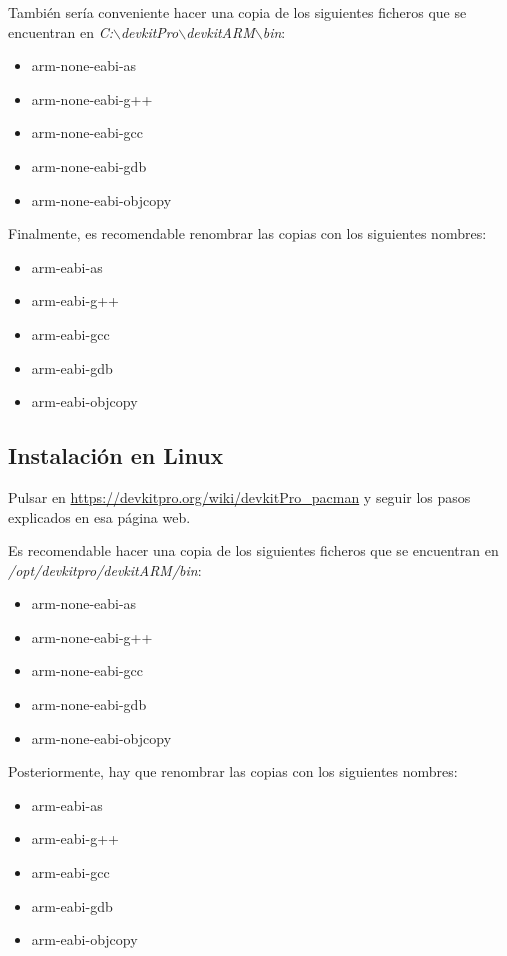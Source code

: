 También sería conveniente hacer una copia de los siguientes ficheros que se encuentran en 
\textit{C:$\backslash$devkitPro$\backslash$devkitARM$\backslash$bin}:
\begin{itemize}
\item arm-none-eabi-as
\item arm-none-eabi-g++
\item arm-none-eabi-gcc
\item arm-none-eabi-gdb
\item arm-none-eabi-objcopy
\end{itemize}

Finalmente, es recomendable renombrar las copias con los siguientes nombres:
\begin{itemize}
\item arm-eabi-as
\item arm-eabi-g++
\item arm-eabi-gcc
\item arm-eabi-gdb
\item arm-eabi-objcopy
\end{itemize}

\subsection{Instalación en Linux}
Pulsar en \url{https://devkitpro.org/wiki/devkitPro_pacman} y seguir los pasos explicados en esa página web.

Es recomendable hacer una copia de los siguientes ficheros que se encuentran en \textit{/opt/devkitpro/devkitARM/bin}:	
\begin{itemize}
 	\item arm-none-eabi-as
 	\item arm-none-eabi-g++
 	\item arm-none-eabi-gcc	
 	\item arm-none-eabi-gdb
   	 \item arm-none-eabi-objcopy
\end{itemize}

Posteriormente, hay que renombrar las copias con los siguientes nombres:	
\begin{itemize}
 	\item arm-eabi-as
 	\item arm-eabi-g++
 	\item arm-eabi-gcc	
 	\item arm-eabi-gdb
    \item arm-eabi-objcopy
    \end{itemize}

